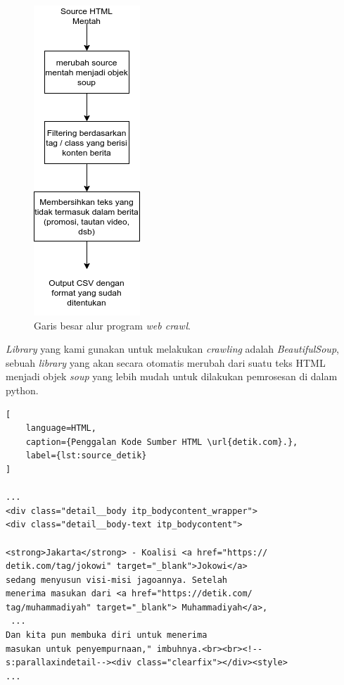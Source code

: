 \begin{figure} [ht]
    \centering
    \includegraphics[width=0.35\linewidth]{gambar/webcrawl_long.png}
    \caption{Garis besar alur program \textit{web crawl}.}
    \label{fig:webcrawl_method}
\end{figure}

\textit{Library} yang kami gunakan untuk melakukan \textit{crawling} adalah \textit{BeautifulSoup}, sebuah \textit{library} yang akan secara otomatis merubah dari suatu teks HTML menjadi objek \textit{soup} yang lebih mudah untuk dilakukan pemrosesan di dalam python.

\begin{lstlisting}[
    language=HTML, 
    caption={Penggalan Kode Sumber HTML \url{detik.com}.},
    label={lst:source_detik}
]

...
<div class="detail__body itp_bodycontent_wrapper">
<div class="detail__body-text itp_bodycontent">

<strong>Jakarta</strong> - Koalisi <a href="https://
detik.com/tag/jokowi" target="_blank">Jokowi</a> 
sedang menyusun visi-misi jagoannya. Setelah 
menerima masukan dari <a href="https://detik.com/
tag/muhammadiyah" target="_blank"> Muhammadiyah</a>,
 ... 
Dan kita pun membuka diri untuk menerima 
masukan untuk penyempurnaan," imbuhnya.<br><br><!--
s:parallaxindetail--><div class="clearfix"></div><style>
...

\end{lstlisting}

